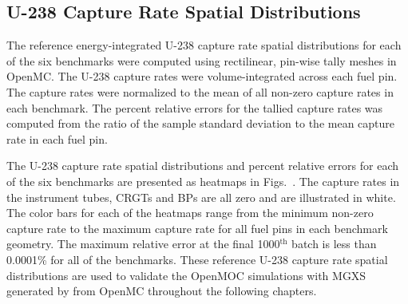 
\clearpage

\subsection{U-238 Capture Rate Spatial Distributions}
\label{subsec:chap7-capture-rates}

The reference energy-integrated U-238 capture rate spatial distributions for each of the six benchmarks were computed using rectilinear, pin-wise tally meshes in OpenMC. The U-238 capture rates were volume-integrated across each fuel pin. The capture rates were normalized to the mean of all non-zero capture rates in each benchmark. The percent relative errors for the tallied capture rates was computed from the ratio of the sample standard deviation to the mean capture rate in each fuel pin.

The U-238 capture rate spatial distributions and percent relative errors for each of the six benchmarks are presented as heatmaps in Figs.~. The capture rates in the instrument tubes, \acp{CRGT} and \acp{BP} are all zero and are illustrated in white. The color bars for each of the heatmaps range from the minimum non-zero capture rate to the maximum capture rate for all fuel pins in each benchmark geometry. The maximum relative error at the final 1000$^{\text{th}}$ batch is less than 0.0001\% for all of the benchmarks. These reference U-238 capture rate spatial distributions are used to validate the OpenMOC simulations with \ac{MGXS} generated by from OpenMC throughout the following chapters.

